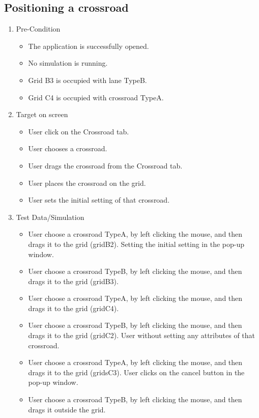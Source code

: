 \subsection{Positioning a crossroad}

\begin{enumerate}
	\item Pre-Condition
	\begin{itemize}
		\item The application is successfully opened.
		\item No simulation is running.
		\item Grid B3 is occupied with lane TypeB.
		\item Grid C4 is occupied with crossroad TypeA.
	\end{itemize}
	\item Target on screen
	\begin{itemize}
		\item User click on the Crossroad tab.
		\item User chooses a crossroad.
		\item User drags the crossroad from the Crossroad tab.
		\item User places the crossroad on the grid.
		\item User sets the initial setting of that crossroad.
	\end{itemize}
	\item Test Data/Simulation
	\begin{itemize}
		\item User choose a crossroad TypeA, by left clicking the mouse, and then drags it to the grid (gridB2). Setting the initial setting in the pop-up window.
		\item User choose a crossroad TypeB, by left clicking the mouse, and then drags it to the grid (gridB3).
		\item User choose a crossroad TypeA, by left clicking the mouse, and then drags it to the grid (gridC4).
		\item User choose a crossroad TypeB, by left clicking the mouse, and then drags it to the grid (gridC2). User without setting any attributes of that crossroad.
		\item User choose a crossroad TypeA, by left clicking the mouse, and then drags it to the grid (gridsC3). User clicks on the cancel button in the pop-up window.
		\item User choose a crossroad TypeB, by left clicking the mouse, and then drags it outside the grid.
	\end{itemize}

\end{enumerate}
